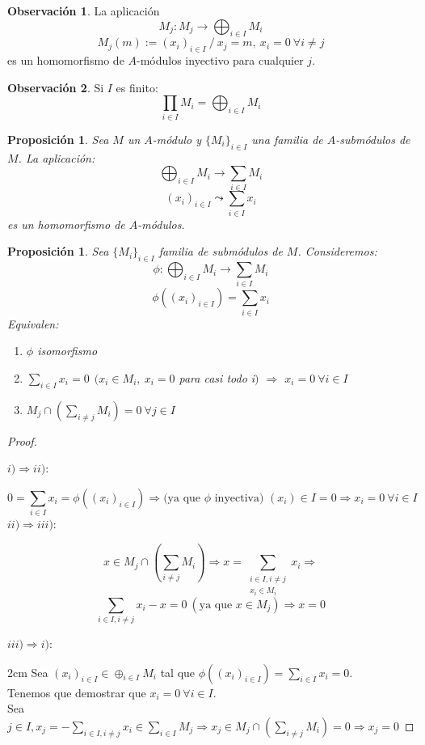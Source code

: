 \documentclass{article}
\theoremstyle{theorem-style}  %
\newtheorem{proposition}[theorem]{Proposición}
\theoremstyle{definition}
\newtheorem*{observation}{Observación} %
\theoremstyle{example-style}
\begin{document}
	\begin{observation}
		La aplicación
		\[M_j:M_j\longrightarrow\bigoplus_{i\in I}M_i\]
		\[M_j(m):= (x_i)_{i\in I} \ / \ x_j=m,\  x_i=0 \ \forall i\neq j \]
		es un homomorfismo de $A$-módulos inyectivo para cualquier $j$.
	\end{observation}

	\begin{observation}
		Si $I$ es finito:
		\[\prod_{i\in I}M_i = \bigoplus_{i\in I}M_i \]
	\end{observation}

	\begin{proposition}
		Sea $M$ un $A$-módulo y $\{M_i\}_{i\in I}$ una familia de $A$-submódulos de $M$. La aplicación:
		\[ \bigoplus_{i\in I}M_i \longrightarrow \sum_{i\in I}M_i \]
		\[ (x_i)_{i\in I} \leadsto \sum_{i\in I}x_i \]
		es un homomorfismo de $A$-módulos.
	\end{proposition}

	\begin{proposition}
		Sea $ \{M_i\}_{i\in I} $ familia de submódulos de $ M $. Consideremos:
		\[\phi : \bigoplus_{i\in I} M_i\longrightarrow \sum_{i\in I }M_i \]
		\[\phi ((x_i)_{i\in I})=\sum_{i\in I} x_i \]
		Equivalen:
		\begin{enumerate}[\hspace{1cm}i)]
			\item $\phi$ isomorfismo
			\item $\sum_{i\in I}x_i=0 \ \  (x_i \in M_i, \ x_i=0$ para casi todo i$)$ $\Rightarrow$ $ x_i=0 \ \forall i \in I $
			\item $M_j \cap (\sum_{i\neq j}M_i) = 0 \ \forall j \in I$
		\end{enumerate}
	\end{proposition}

	\begin{proof}
		\ 

		$i) \Rightarrow ii)$:

		 \[ 0=\sum_{i\in I} x_i=\phi ((x_i)_{i\in I}) \Rightarrow \text{(ya que $\phi$ inyectiva) } (x_i) \in I =0 \Rightarrow x_i =0 \ \forall i \in I \]
		$ii) \Rightarrow iii)$:

		\[ x \in M_j \cap (\sum_{i\neq j}M_i) \Rightarrow x=\sum_{\substack{i\in I, i\neq j \\ x_i\in M_i}} x_i \Rightarrow\]
		 \[ \sum_{i\in I, i\neq j} x_i -x = 0 \  (\text{ya que }x\in M_j) \Rightarrow  x=0  \]

		$iii) \Rightarrow i)$:

		 2cm \dimexpr\linewidth-2cm\relax
		Sea $ (x_i)_{i\in I} \in \oplus_{i\in I} M_i  $ tal que $ \phi ((x_i)_{i\in I})=\sum_{i\in I} x_i=0 $. \\
		Tenemos que demostrar que $ x_i=0 \ \forall i \in I $. \\
		Sea $ j\in I, x_j = -\sum_{i\in I, i\neq j}x_i \in \sum_{i\in I} M_j \Rightarrow x_j \in M_j \cap (\sum_{i\neq j} M_i)=0 \Rightarrow x_j=0 $
	\end{proof}
\end{document}
